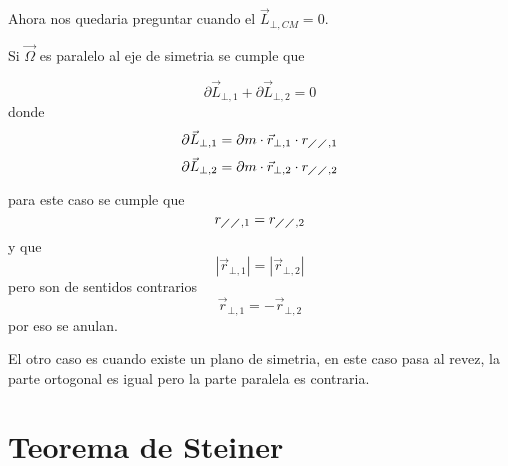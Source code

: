 \documentclass[../Main.tex]{subfiles}
\begin{document}
{    Ahora nos quedaria preguntar cuando el $\vec{L}_{\bot, CM} = 0$.

    Si $\vec{\Omega}$ es paralelo al eje de simetria se cumple que

}

\npage{
}
{

    \begin{equation*}
        \partial \vec{L}_{\bot, 1} + \partial \vec{L}_{\bot, 2} = 0
    \end{equation*}
    donde
    \begin{equation*}
        \partial \vec{L}_{\bot, 1} = \partial m \cdot \vec{r}_{\bot , 1} \cdot r_{\diagup \diagup , 1}
    \end{equation*}
    \begin{equation*}
        \partial \vec{L}_{\bot, 2} = \partial m \cdot \vec{r}_{\bot , 2} \cdot r_{\diagup \diagup , 2}
    \end{equation*}

    para este caso se cumple que
    \begin{equation*}
        r_{\diagup \diagup , 1} = r_{\diagup \diagup , 2}
    \end{equation*}
    y que
    \begin{equation*}
        | \vec{r}_{\bot , 1} | = | \vec{r}_{\bot , 2} |
    \end{equation*}
    pero son de sentidos contrarios
    \begin{equation*}
        \vec{r}_{\bot , 1} =  - \vec{r}_{\bot , 2}
    \end{equation*}
    por eso se anulan.

    El otro caso es cuando existe un plano de simetria, en este caso pasa al revez,
    la parte ortogonal es igual pero la parte paralela es contraria.

    \section{Teorema de Steiner}

}
\end{document}
